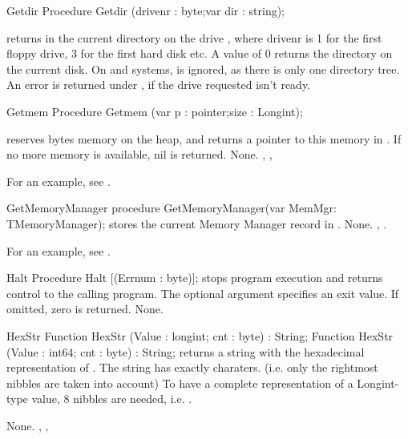 
\begin{procedure}{Getdir}
\Declaration
Procedure Getdir (drivenr : byte;var dir : string);

\Description
{} returns in  the current directory on the drive
, where {drivenr} is 1 for the first floppy drive, 3 for the
first hard disk etc. A value of 0 returns the directory on the current disk.
On \linux and \unix systems,  is ignored, as there is only one
directory tree.
\Errors
An error is returned under \dos, if the drive requested isn't ready.
\SeeAlso
{}
\end{procedure}


\begin{procedure}{Getmem}
\Declaration
Procedure Getmem (var p : pointer;size : Longint);

\Description
{} reserves  bytes memory on the heap, and returns a
pointer to this memory in . If no more memory is available, nil is
returned.
\Errors
None.
\SeeAlso
{}, , 
\end{procedure}
For an example, see .

\begin{procedure}{GetMemoryManager}
\Declaration
procedure GetMemoryManager(var MemMgr: TMemoryManager);
\Description
{} stores the current Memory Manager record in
.
\Errors
None.
\SeeAlso
{}, .
\end{procedure}

For an example, see \progref.

\begin{procedure}{Halt}
\Declaration
Procedure Halt [(Errnum : byte)];
\Description
{} stops program execution and returns control to the calling
program. The optional argument  specifies an exit value. If
omitted, zero is returned.
\Errors
None.
\SeeAlso
{}
\end{procedure}


\begin{function}{HexStr}
\Declaration
Function HexStr (Value : longint; cnt : byte) : String;
Function HexStr (Value : int64; cnt : byte) : String;
\Description
{} returns a string with the hexadecimal representation
of . The string has exactly  charaters.
 (i.e. only the  rightmost nibbles are taken into account)
To have a complete representation of a Longint-type value, 8
nibbles are needed, i.e. .

\Errors
None.
\SeeAlso
{}, , 
\end{function}


